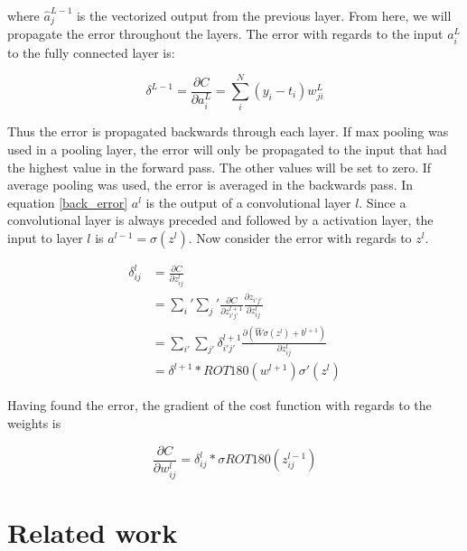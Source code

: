 \documentclass[thesis.tex]{subfiles}
\begin{document}
where $\hat{a}_{j}^{L-1}$ is the vectorized output from the previous layer. From here, we will propagate the error throughout the layers. The error with regards to the input $a_i^L$ to the fully connected layer is:

\begin{equation} %
  \delta^{L-1} = \frac{\partial C}{\partial a_i^L} = \sum_i^N (y_i - t_i)w_{ji}^{L}
  \label{back_error}
\end{equation}

Thus the error is propagated backwards through each layer. If max pooling was used in a pooling layer, the error will only be propagated to the input that had the highest value in the forward pass. The other values will be set to zero. If average pooling was used, the error is averaged in the backwards pass.
In equation \ref{back_error} $a^l$ is the output of a convolutional layer $l$. Since a convolutional layer is always preceded and followed by a activation layer, the input to layer $l$ is $a^{l-1} = \sigma(z^l)$. Now consider the error with regards to $z^l$.

\begin{equation}
  \begin{aligned}
  \delta_{ij}^l &= \frac{\partial C}{\partial z_{ij}^l} \\
  &= \sum_i' \sum_j' \frac{\partial C}{\partial z_{i'j'}^{l+1}}\frac{\partial z_{i'j'}}{\partial z_{ij}^l} \\
  &= \sum_{i'} \sum_{j'}\delta_{i'j'}^{l+1} \frac{\partial (\hat{W}\sigma(z^l) + b^{l+1})}{\partial z_{ij}^l} \\
  &= \delta^{l+1} * ROT180(w^{l+1})\sigma'(z^l)
  \end{aligned}
\end{equation}

Having found the error, the gradient of the cost function with regards to the weights is

\begin{equation} %
  \frac{\partial C}{\partial w_{ij}^l} = \delta_{ij}^l * \sigma{ROT180(z_{ij}^{l-1})}
\end{equation}




\section{Related work} \label{relatedwork}
\end{document}

